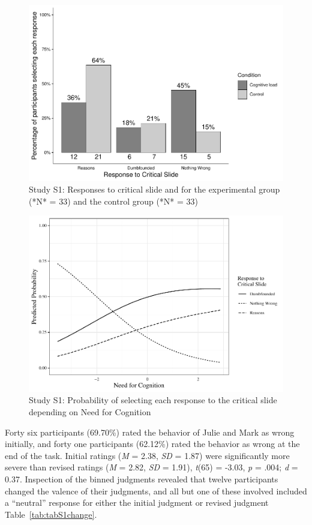 \documentclass[
  american,
  man,floatsintext]{apa7}
\begin{document}
\begin{figure}[!h]
\includegraphics{Supplementary_files/figure-latex/S1S1fig2criticalcondition-1} \caption{Study S1: Responses to critical slide and for the experimental group (*N* = 33) and the control group (*N* = 33)}\label{fig:S1S1fig2criticalcondition}
\end{figure}

\begin{figure}[!h]
\includegraphics{Supplementary_files/figure-latex/S1ggplotlogit1-1} \caption{Study S1: Probability of selecting each response to the critical slide depending on Need for Cognition}\label{fig:S1ggplotlogit1}
\end{figure}

\newpage

\newpage

Forty six participants (69.70\%) rated the behavior of Julie and Mark as wrong initially, and forty one participants (62.12\%) rated the behavior as wrong at the end of the task. Initial ratings (\emph{M} = 2.38, \emph{SD} = 1.87) were significantly more severe than revised ratings (\emph{M} = 2.82, \emph{SD} = 1.91), \emph{t}(65) = -3.03, \emph{p} = .004; \emph{d} = 0.37. Inspection of the binned judgments revealed that twelve participants changed the valence of their judgments, and all but one of these involved included a \enquote{neutral} response for either the initial judgment or revised judgment Table~\ref{tab:tabS1change}.
\end{document}
